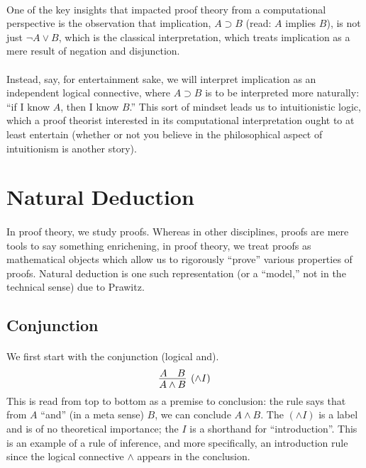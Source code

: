 \documentclass[a4paper]{article}
\begin{document}
\newpage

\paragraph{}
One of the key insights that impacted proof theory from a computational
perspective is the observation that implication, $A \supset B$ (read: $A$
implies $B$), is not just $\neg A \lor B$, which is the classical
interpretation, which treats implication as a mere result of negation and
disjunction.

\paragraph{}
Instead, say, for entertainment sake, we will interpret implication as an
independent logical connective, where $A \supset B$ is to be interpreted more
naturally: ``if I know $A$, then I know $B$.'' This sort of mindset leads us to
intuitionistic logic, which a proof theorist interested in its computational
interpretation ought to at least entertain (whether or not you believe in the
philosophical aspect of intuitionism is another story).

\section{Natural Deduction}
\paragraph{}
In proof theory, we study proofs. Whereas in other disciplines, proofs are mere
tools to say something enrichening, in proof theory, we treat proofs as
mathematical objects which allow us to rigorously ``prove'' various properties
of proofs. Natural deduction is one such representation (or a ``model,'' not in
the technical sense) due to Prawitz.

\subsection{Conjunction}
\paragraph{}
We first start with the conjunction (logical and).
$$\infer[(\land I)]{A \land B}{A & B}$$
This is read from top to bottom as a premise to conclusion: the rule says that
from $A$ ``and'' (in a meta sense) $B$, we can conclude $A \land B$. The $(\land
I)$ is a label and is of no theoretical importance; the $I$ is a shorthand for
``introduction''. This is an example of a rule of inference, and more
specifically, an introduction rule since the logical connective $\land$ appears
in the conclusion.
\end{document}
